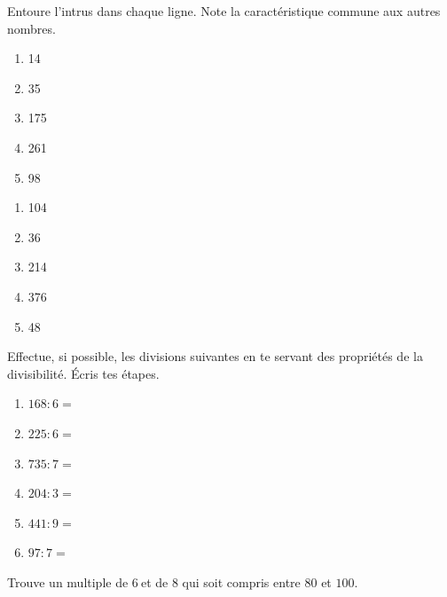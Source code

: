 \documentclass[../../syllabus_1.tex]{subfiles}
\begin{document}

\begin{exercise}
      Entoure l'intrus dans chaque ligne. Note la caractéristique commune aux autres nombres.
      \begin{enumerate}[cols=5, label=\ ]
            \item 14
            \item 35
            \item 175
            \item 261
            \item 98
      \end{enumerate}

      \begin{enumerate}[cols=5, label=\ ]
            \item 104
            \item 36
            \item 214
            \item 376
            \item 48
      \end{enumerate}
\end{exercise}

\begin{exercise}
      Effectue, si possible, les divisions suivantes en te servant des propriétés de la divisibilité. Écris tes étapes.
      \begin{enumerate}[cols=2, itemsep=6em]
            \item $168:6=$
            \item $225:6=$
            \item $735:7=$
            \item $204:3=$
            \item $441:9=$
            \item $97:7=$
      \end{enumerate}
\end{exercise}
\vspace{6em}



\begin{exercise}
      Trouve un multiple de \(6\ \)et de \(8\) qui soit compris entre \(80\) et \(100.\)
\end{exercise}
\end{document}
